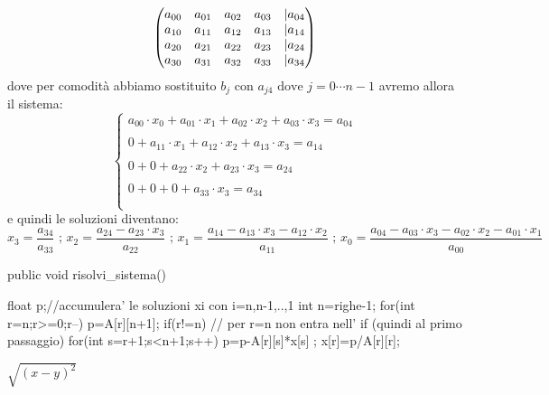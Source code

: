 \documentclass[10pt,a4paper]{article}
\begin{document}
 \[\begin{pmatrix}
 a_{0 0}&a_{0 1}&a_{0 2}&a_{0 3}&\arrowvert a_{0 4}\\
 a_{1 0}&a_{1 1}&a_{1 2}&a_{1 3}&\arrowvert a_{1 4}\\
 a_{2 0}&a_{2 1}&a_{2 2}&a_{2 3}&\arrowvert a_{2 4}\\
 a_{3 0}&a_{3 1}&a_{3 2}&a_{3 3}&\arrowvert a_{3 4}\\
 \end{pmatrix}\] dove per comodità abbiamo sostituito $ b_j \mbox{ con  }a_{j 4}\mbox{ dove   } j=0 \cdots n-1$
 avremo allora il sistema:
  \[ \left\{
 \begin{array}{rl}
 a_{00}\cdot x_0+a_{01}\cdot x_1+a_{02}\cdot x_2+a_{03}\cdot x_3=a_{04}\\\\
 0+a_{11}\cdot x_1+a_{12}\cdot x_2+a_{13}\cdot x_3=a_{14}\\\\
 0+0+a_{22}\cdot x_2+a_{23}\cdot x_3=a_{24}\\\\
 0+0+0+a_{33}\cdot x_3=a_{34}\\\\
 \end{array}
 \right.   \]
 e quindi le soluzioni diventano:
 \[ x_3=\frac{a_{34}}{a_{3 3}} \mbox{ ; } x_2=\frac{a_{24}-a_{2 3}\cdot x_3}{a_{2 2}}\mbox{ ; }
 x_1=\frac{a_{14}-a_{1 3} \cdot x_3-a_{1 2}\cdot x_2}{a_{1 1}} \mbox{ ; }x_0=\frac{a_{04}-a_{0 3}\cdot x_3-a_{02}\cdot x_2-a_{01}\cdot x_1}{a_{00}} \]
\begin{java}
	public void risolvi_sistema()
	{
		float p;//accumulera' le soluzioni xi con i=n,n-1,..,1
		int n=righe-1;
		for(int r=n;r>=0;r--) 
		{
			p=A[r][n+1];
			if(r!=n) // per r=n non entra nell' if (quindi al primo passaggio)
			{
				for(int s=r+1;s<n+1;s++)
				{
					p=p-A[r][s]*x[s] ;
				}
			}
			x[r]=p/A[r][r];
		}
		
	}
\end{java}

$ \sqrt{(x-y)^2} $
\end{document}
